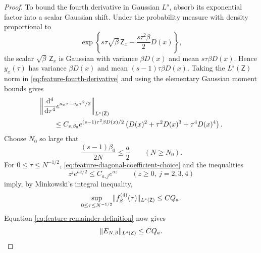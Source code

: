\documentclass[11pt,reqno]{amsart}
\numberwithin{equation}{section}
\theoremstyle{plain}
\theoremstyle{definition}
\DeclarePairedDelimiter{\norm}{\lVert}{\rVert}
\newcommand{\dd}{\mathop{}\!\mathrm d}
\newcommand{\be}{\beta}
\begin{document}
\begin{proof}
To bound the fourth derivative in Gaussian $L^s$, absorb its exponential factor into a scalar Gaussian shift. Under the probability measure with density proportional to
\begin{equation}
 \exp\left\{s\tau\sqrt\be\,\mathsf Z_x
 -\frac{s\tau^2\be}{2}D(x)\right\},
 \label{eq:feature-gaussian-shift-density}
\end{equation}
the scalar $\sqrt\be\,\mathsf Z_x$ is Gaussian with variance $\be D(x)$ and mean $s\tau\be D(x)$.  Hence $y_x(\tau)$ has variance $\be D(x)$ and mean $(s-1)\tau\be D(x)$.  Taking the $L^s(\mathsf Z)$ norm in \eqref{eq:feature-fourth-derivative} and using the elementary Gaussian moment bounds gives
\begin{align}
 &\norm*{\frac{\dd^4}{\dd\tau^4}
 e^{a_x\tau-c_x\tau^2/2}}_{L^s(\mathsf Z)}
 \notag\\
 &\qquad\leq C_{s,\be_0}
 e^{(s-1)\tau^2\be D(x)/2}
 \left(D(x)^2+\tau^2D(x)^3+\tau^4D(x)^4\right).
 \label{eq:feature-fourth-derivative-bound}
\end{align}
Choose $N_0$ so large that
\begin{equation}
 \frac{(s-1)\be_0}{2N}\leq\frac a2
 \qquad(N\geq N_0).
 \label{eq:feature-diagonal-coefficient-choice}
\end{equation}
For $0\leq\tau\leq N^{-1/2}$, \eqref{eq:feature-diagonal-coefficient-choice} and the inequalities
\begin{equation}
 z^j e^{az/2}\leq C_{a,j}e^{az}
 \qquad(z\geq0,
 \ j=2,3,4)
 \label{eq:feature-polynomial-absorption}
\end{equation}
imply, by Minkowski's integral inequality,
\begin{equation}
 \sup_{0\leq\tau\leq N^{-1/2}}
 \norm{f_{\be}^{(4)}(\tau)}_{L^s(\mathsf Z)}
 \leq C Q_a.
 \label{eq:feature-fourth-derivative-Ls}
\end{equation}
Equation \eqref{eq:feature-remainder-definition} now gives
\begin{equation}
 \norm{E_{N,\be}}_{L^s(\mathsf Z)}\leq C Q_a.
 \label{eq:feature-remainder-Ls}
\end{equation}


\end{proof}
\end{document}
